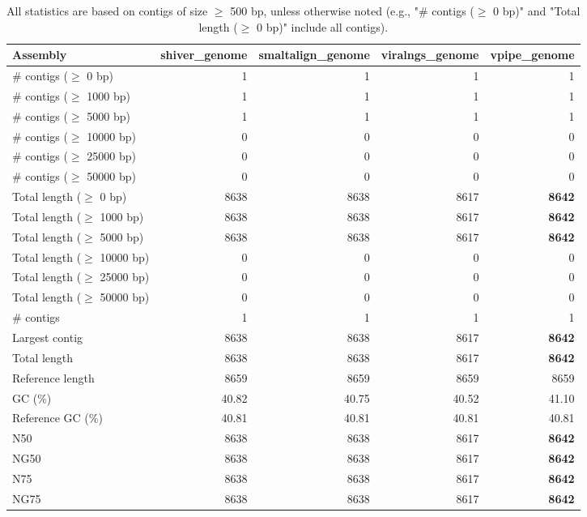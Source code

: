 \documentclass[12pt,a4paper]{article}
\begin{document}
\begin{table}[ht]
\begin{center}
\caption{All statistics are based on contigs of size $\geq$ 500 bp, unless otherwise noted (e.g., "\# contigs ($\geq$ 0 bp)" and "Total length ($\geq$ 0 bp)" include all contigs).}
\begin{tabular}{|l*{4}{|r}|}
\hline
Assembly & shiver\_genome & smaltalign\_genome & viralngs\_genome & vpipe\_genome \\ \hline
\# contigs ($\geq$ 0 bp) & 1 & 1 & 1 & 1 \\ \hline
\# contigs ($\geq$ 1000 bp) & 1 & 1 & 1 & 1 \\ \hline
\# contigs ($\geq$ 5000 bp) & 1 & 1 & 1 & 1 \\ \hline
\# contigs ($\geq$ 10000 bp) & 0 & 0 & 0 & 0 \\ \hline
\# contigs ($\geq$ 25000 bp) & 0 & 0 & 0 & 0 \\ \hline
\# contigs ($\geq$ 50000 bp) & 0 & 0 & 0 & 0 \\ \hline
Total length ($\geq$ 0 bp) & 8638 & 8638 & 8617 & {\bf 8642} \\ \hline
Total length ($\geq$ 1000 bp) & 8638 & 8638 & 8617 & {\bf 8642} \\ \hline
Total length ($\geq$ 5000 bp) & 8638 & 8638 & 8617 & {\bf 8642} \\ \hline
Total length ($\geq$ 10000 bp) & 0 & 0 & 0 & 0 \\ \hline
Total length ($\geq$ 25000 bp) & 0 & 0 & 0 & 0 \\ \hline
Total length ($\geq$ 50000 bp) & 0 & 0 & 0 & 0 \\ \hline
\# contigs & 1 & 1 & 1 & 1 \\ \hline
Largest contig & 8638 & 8638 & 8617 & {\bf 8642} \\ \hline
Total length & 8638 & 8638 & 8617 & {\bf 8642} \\ \hline
Reference length & 8659 & 8659 & 8659 & 8659 \\ \hline
GC (\%) & 40.82 & 40.75 & 40.52 & 41.10 \\ \hline
Reference GC (\%) & 40.81 & 40.81 & 40.81 & 40.81 \\ \hline
N50 & 8638 & 8638 & 8617 & {\bf 8642} \\ \hline
NG50 & 8638 & 8638 & 8617 & {\bf 8642} \\ \hline
N75 & 8638 & 8638 & 8617 & {\bf 8642} \\ \hline
NG75 & 8638 & 8638 & 8617 & {\bf 8642} \\ \hline

\end{tabular}
\end{center}
\end{table}
\end{document}
